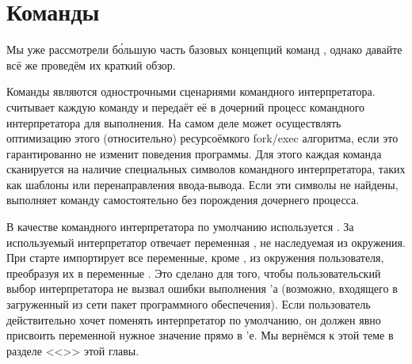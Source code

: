 \chapter{Команды}
\label{chap:commands}

Мы уже рассмотрели б\'{о}льшую часть базовых концепций команд
\GNUmake{}, однако давайте всё же проведём их краткий обзор.

Команды являются однострочными сценариями командного интерпретатора.
\GNUmake{} считывает каждую команду и передаёт её в дочерний процесс
командного интерпретатора для выполнения. На самом деле \GNUmake{}
может осуществлять оптимизацию этого (относительно) ресурсоёмкого
fork/exec алгоритма, если это гарантированно не изменит поведения
программы. Для этого каждая команда сканируется на наличие специальных
символов командного интерпретатора, таких как шаблоны или перенаправления
ввода-вывода. Если эти символы не найдены, \GNUmake{} выполняет команду
самостоятельно без порождения дочернего процесса.

В качестве командного интерпретатора по умолчанию используется
. За используемый интерпретатор отвечает переменная
, не наследуемая из окружения. При старте \GNUmake{}
импортирует все переменные, кроме , из окружения
пользователя, преобразуя их в переменные \GNUmake{}. Это сделано для
того, чтобы пользовательский выбор интерпретатора не вызвал ошибки
выполнения \Makefile{}'а (возможно, входящего в загруженный из сети
пакет программного обеспечения). Если пользователь действительно хочет
поменять интерпретатор по умолчанию, он должен явно присвоить
переменной  нужное значение прямо в \Makefile{}'е. Мы
вернёмся к этой теме в разделе <<>> этой
главы.







